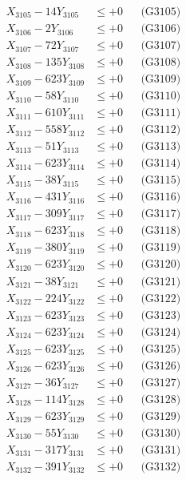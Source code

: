 \documentclass[a4paper,10pt]{article}
\begin{document}
{\begin{align}
X_{3105} - 14Y_{3105} &\leq +0 && \text{(G3105)} \\
X_{3106} - 2Y_{3106} &\leq +0 && \text{(G3106)} \\
X_{3107} - 72Y_{3107} &\leq +0 && \text{(G3107)} \\
X_{3108} - 135Y_{3108} &\leq +0 && \text{(G3108)} \\
X_{3109} - 623Y_{3109} &\leq +0 && \text{(G3109)} \\
X_{3110} - 58Y_{3110} &\leq +0 && \text{(G3110)} \\
\allowbreak
X_{3111} - 610Y_{3111} &\leq +0 && \text{(G3111)} \\
X_{3112} - 558Y_{3112} &\leq +0 && \text{(G3112)} \\
X_{3113} - 51Y_{3113} &\leq +0 && \text{(G3113)} \\
X_{3114} - 623Y_{3114} &\leq +0 && \text{(G3114)} \\
X_{3115} - 38Y_{3115} &\leq +0 && \text{(G3115)} \\
X_{3116} - 431Y_{3116} &\leq +0 && \text{(G3116)} \\
X_{3117} - 309Y_{3117} &\leq +0 && \text{(G3117)} \\
X_{3118} - 623Y_{3118} &\leq +0 && \text{(G3118)} \\
X_{3119} - 380Y_{3119} &\leq +0 && \text{(G3119)} \\
X_{3120} - 623Y_{3120} &\leq +0 && \text{(G3120)} \\
\allowbreak
X_{3121} - 38Y_{3121} &\leq +0 && \text{(G3121)} \\
X_{3122} - 224Y_{3122} &\leq +0 && \text{(G3122)} \\
X_{3123} - 623Y_{3123} &\leq +0 && \text{(G3123)} \\
X_{3124} - 623Y_{3124} &\leq +0 && \text{(G3124)} \\
X_{3125} - 623Y_{3125} &\leq +0 && \text{(G3125)} \\
X_{3126} - 623Y_{3126} &\leq +0 && \text{(G3126)} \\
X_{3127} - 36Y_{3127} &\leq +0 && \text{(G3127)} \\
X_{3128} - 114Y_{3128} &\leq +0 && \text{(G3128)} \\
X_{3129} - 623Y_{3129} &\leq +0 && \text{(G3129)} \\
X_{3130} - 55Y_{3130} &\leq +0 && \text{(G3130)} \\
\allowbreak
X_{3131} - 317Y_{3131} &\leq +0 && \text{(G3131)} \\
X_{3132} - 391Y_{3132} &\leq +0 && \text{(G3132)} \\

\end{align}}
\end{document}
